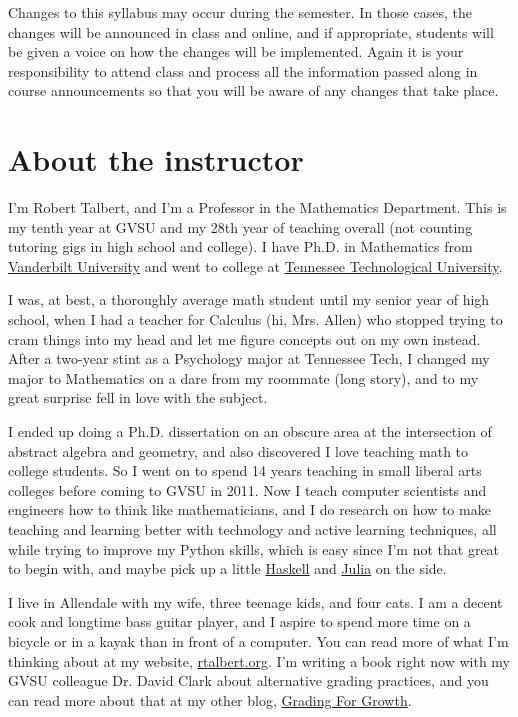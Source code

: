 \documentclass[]{article}
\begin{document}
\bigskip

\begin{tcolorbox}[title=Disclaimer, colback=yellow!15!white]
Changes to this syllabus may occur during the semester. In those cases,
the changes will be announced in class and online, and if appropriate,
students will be given a voice on how the changes will be implemented.
Again it is your responsibility to attend class and process all the
information passed along in course announcements so that you will be
aware of any changes that take place.
\end{tcolorbox}



\section{About the instructor}

I'm Robert Talbert, and I'm a Professor in the Mathematics Department.  This is my tenth year at GVSU and my 28th year of teaching overall (not counting tutoring gigs in high school and college). I have Ph.D. in Mathematics from \href{http://www.vanderbilt.edu}{Vanderbilt University} and went to college at \href{http://www.tntech.edu}{Tennessee Technological University}. 

I was, at best, a thoroughly average math student until my senior year of high school, when I had a teacher for Calculus (hi, Mrs. Allen) who stopped trying to cram things into my
head and let me figure concepts out on my own instead. After a two-year
stint as a Psychology major at Tennessee Tech, I changed my major to
Mathematics on a dare from my roommate (long story), and to my great surprise fell in love with the subject. 

I ended up doing a Ph.D. dissertation on an obscure area at the
intersection of abstract algebra and geometry, and also discovered I love teaching math to college students. So I went on to spend 14 years teaching in small liberal arts colleges before coming to GVSU in 2011.  Now I teach computer scientists and engineers how to think like mathematicians,
and I do research on how to make teaching and learning better with
technology and active learning techniques, all while trying to improve my Python skills, which is easy since I'm not that great to begin with, and maybe pick up a little \href{https://www.haskell.org/}{Haskell} and \href{https://julialang.org/}{Julia} on the side. 

I live in Allendale with my wife, three teenage kids, and four cats. I am a decent cook and longtime bass guitar player, and I aspire to spend more time on a bicycle or in a kayak than in front of a computer. You can read more of what I'm thinking about at my website, \href{https://rtalbert.org}{rtalbert.org}. I'm writing a book right now with my GVSU colleague Dr. David Clark about alternative grading practices, and you can read more about that at my other blog, \href{http://gradingforgrowth.substack.com}{Grading For Growth}. 
\end{document}
